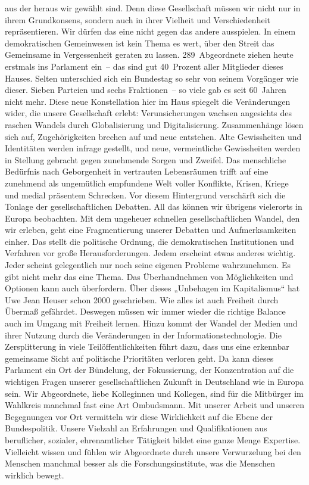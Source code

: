 \documentclass[a4paper,11pt]{article}
\begin{document}
aus der heraus wir gewählt sind. Denn diese Gesellschaft müssen wir nicht nur in ihrem Grundkonsens, sondern auch in ihrer Vielheit und Verschiedenheit repräsentieren. Wir dürfen das eine nicht gegen das andere ausspielen. In einem demokratischen Gemeinwesen ist kein Thema es wert, über den Streit das Gemeinsame in Vergessenheit geraten zu lassen. 289 Abgeordnete ziehen heute erstmals ins Parlament ein – das sind gut 40 Prozent aller Mitglieder dieses Hauses. Selten unterschied sich ein Bundestag so sehr von seinem Vorgänger wie dieser. Sieben Parteien und sechs Fraktionen – so viele gab es seit 60 Jahren nicht mehr. Diese neue Konstellation hier im Haus spiegelt die Veränderungen wider, die unsere Gesellschaft erlebt: Verunsicherungen wachsen angesichts des raschen Wandels durch Globalisierung und Digitalisierung. Zusammenhänge lösen sich auf, Zugehörigkeiten brechen auf und neue entstehen. Alte Gewissheiten und Identitäten werden infrage gestellt, und neue, vermeintliche Gewissheiten werden in Stellung gebracht gegen zunehmende Sorgen und Zweifel. Das menschliche Bedürfnis nach Geborgenheit in vertrauten Lebensräumen trifft auf eine zunehmend als ungemütlich empfundene Welt voller Konflikte, Krisen, Kriege und medial präsentem Schrecken. Vor diesem Hintergrund verschärft sich die Tonlage der gesellschaftlichen Debatten. All das können wir übrigens vielerorts in Europa beobachten. Mit dem ungeheuer schnellen gesellschaftlichen Wandel, den wir erleben, geht eine Fragmentierung unserer Debatten und Aufmerksamkeiten einher. Das stellt die politische Ordnung, die demokratischen Institutionen und Verfahren vor große Herausforderungen. Jedem erscheint etwas anderes wichtig. Jeder scheint gelegentlich nur noch seine eigenen Probleme wahrzunehmen. Es gibt nicht mehr das eine Thema. Das Überhandnehmen von Möglichkeiten und Optionen kann auch überfordern. Über dieses „Unbehagen im Kapitalismus“ hat Uwe Jean Heuser schon 2000 geschrieben. Wie alles ist auch Freiheit durch Übermaß gefährdet. Deswegen müssen wir immer wieder die richtige Balance auch im Umgang mit Freiheit lernen. Hinzu kommt der Wandel der Medien und ihrer Nutzung durch die Veränderungen in der Informationstechnologie. Die Zersplitterung in viele Teilöffentlichkeiten führt dazu, dass uns eine erkennbar gemeinsame Sicht auf politische Prioritäten verloren geht. Da kann dieses Parlament ein Ort der Bündelung, der Fokussierung, der Konzentration auf die wichtigen Fragen unserer gesellschaftlichen Zukunft in Deutschland wie in Europa sein. Wir Abgeordnete, liebe Kolleginnen und Kollegen, sind für die Mitbürger im Wahlkreis manchmal fast eine Art Ombudsmann. Mit unserer Arbeit und unseren Begegnungen vor Ort vermitteln wir diese Wirklichkeit auf die Ebene der Bundespolitik. Unsere Vielzahl an Erfahrungen und Qualifikationen aus beruflicher, sozialer, ehrenamtlicher Tätigkeit bildet eine ganze Menge Expertise. Vielleicht wissen und fühlen wir Abgeordnete durch unsere Verwurzelung bei den Menschen manchmal besser als die Forschungsinstitute, was die Menschen wirklich bewegt.
\end{document}
